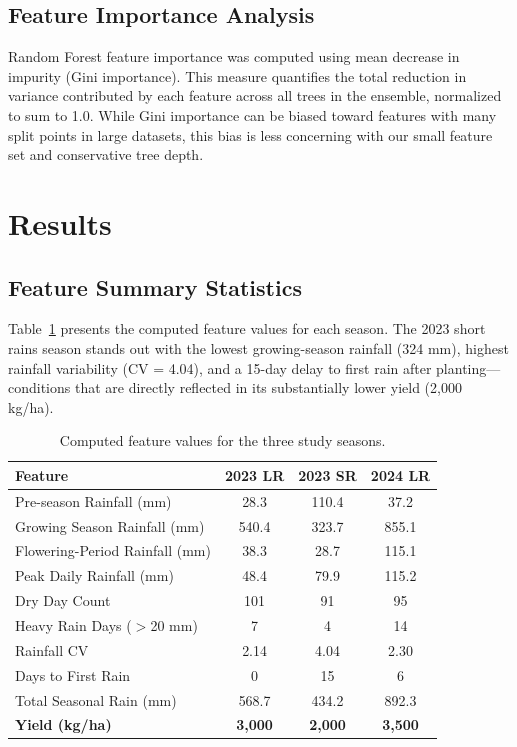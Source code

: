 \documentclass[11pt,a4paper]{article}
\begin{document}
\subsection{Feature Importance Analysis}

Random Forest feature importance was computed using mean decrease in impurity (Gini importance). This measure quantifies the total reduction in variance contributed by each feature across all trees in the ensemble, normalized to sum to 1.0. While Gini importance can be biased toward features with many split points in large datasets, this bias is less concerning with our small feature set and conservative tree depth.

\section{Results}

\subsection{Feature Summary Statistics}

Table~\ref{tab:featvals} presents the computed feature values for each season. The 2023 short rains season stands out with the lowest growing-season rainfall (324 mm), highest rainfall variability (CV = 4.04), and a 15-day delay to first rain after planting---conditions that are directly reflected in its substantially lower yield (2,000 kg/ha).

\begin{table}[htbp]
\centering
\caption{Computed feature values for the three study seasons.}
\label{tab:featvals}
\begin{tabular}{lccc}
\toprule
\textbf{Feature} & \textbf{2023 LR} & \textbf{2023 SR} & \textbf{2024 LR} \\
\midrule
Pre-season Rainfall (mm) & 28.3 & 110.4 & 37.2 \\
Growing Season Rainfall (mm) & 540.4 & 323.7 & 855.1 \\
Flowering-Period Rainfall (mm) & 38.3 & 28.7 & 115.1 \\
Peak Daily Rainfall (mm) & 48.4 & 79.9 & 115.2 \\
Dry Day Count & 101 & 91 & 95 \\
Heavy Rain Days ($>$20 mm) & 7 & 4 & 14 \\
Rainfall CV & 2.14 & 4.04 & 2.30 \\
Days to First Rain & 0 & 15 & 6 \\
Total Seasonal Rain (mm) & 568.7 & 434.2 & 892.3 \\
\midrule
\textbf{Yield (kg/ha)} & \textbf{3,000} & \textbf{2,000} & \textbf{3,500} \\
\bottomrule
\end{tabular}
\end{table}
\end{document}
